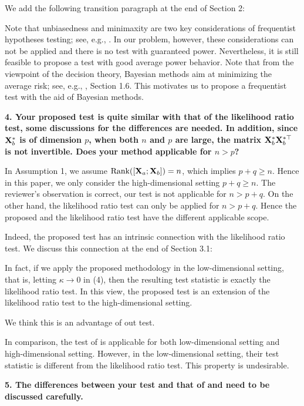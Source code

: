 \documentclass[11pt]{article}
\DeclareMathOperator{\myRank}{Rank}
\theoremstyle{plain}
\theoremstyle{definition}
\theoremstyle{remark}
\begin{document}
We add the following transition paragraph at the end of Section 2:
\begin{adjustwidth}{3em}{3em}
Note that unbiasedness and minimaxity are two key considerations of frequentist hypotheses testing; see, e.g., \cite{Lehmann}.
In our problem, however, these considerations can not be applied and there is no test with guaranteed power.
Nevertheless, it is still feasible to propose a test with good average power     behavior.
Note that from the viewpoint of the decision theory, Bayesian methods aim at     minimizing the average risk; see, e.g., \cite{Lehmann}, Section 1.6.
This motivates us to propose a frequentist test with the aid of Bayesian methods.
\end{adjustwidth}

\textbf{
    4. Your proposed test is quite similar with that of the likelihood ratio test, some discussions for the differences are needed.
    In addition, since $\mathbf{X}^*_b$ is of dimension $p$, when both $n$ and $p$ are large, the matrix $\mathbf{X}^*_b \mathbf{X}^{*\top}_b$ is not invertible.
    Does your method applicable for $n>p$?
}

In Assumption 1, we assume $\myRank([\BX_a ; \BX_b]) = n$, which implies $p+q \geq n$.
Hence in this paper, we only consider the high-dimensional setting $p+q\geq n$.
The reviewer's observation is correct, our test is not applicable for $n>p+q$.
On the other hand, the likelihood ratio test can only be applied for $n> p+q$.
Hence the proposed and the likelihood ratio test have the different applicable scope.

Indeed, the proposed test has an intrinsic connection with the likelihood ratio test.
We discuss this connection at the end of Section 3.1:
\begin{adjustwidth}{3em}{3em}
In fact, if we apply the proposed methodology in the low-dimensional setting, that is, letting $\kappa \to 0$ in (4), then the resulting test statistic is exactly the likelihood ratio test. 
In this view, the proposed test is an extension of the likelihood ratio test to the high-dimensional setting.
\end{adjustwidth}
We think this is an advantage of out test.

In comparison, the test of \cite{Goeman2006} is applicable for both low-dimensional setting and high-dimensional setting.
However, in the low-dimensional setting, their test statistic is different from the likelihood ratio test.
This property is undesirable.


\textbf{
    5. The differences between your test and that of \cite{Goeman2006} and \cite{Lan2014Testing} need to be discussed carefully.
}
\end{document}
